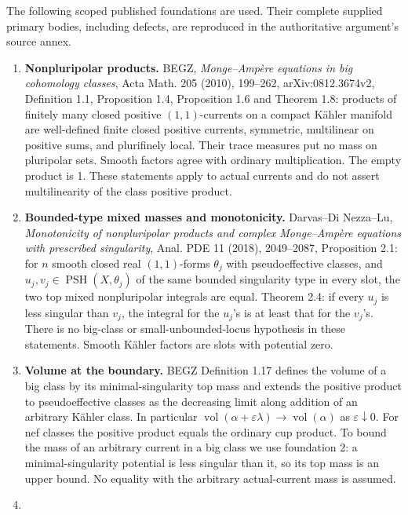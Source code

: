 \documentclass[
  11pt,
]{article}
\providecommand{\tightlist}{%
  \setlength{\itemsep}{0pt}\setlength{\parskip}{0pt}}
\begin{document}
The following scoped published foundations are used. Their complete
supplied primary bodies, including defects, are reproduced in the
authoritative argument's source annex.

\begin{enumerate}
\def\labelenumi{\arabic{enumi}.}
\tightlist
\item
  \textbf{Nonpluripolar products.} BEGZ, \emph{Monge--Ampère equations
  in big cohomology classes}, Acta Math. 205 (2010), 199--262,
  arXiv:0812.3674v2, Definition 1.1, Proposition 1.4, Proposition 1.6
  and Theorem 1.8: products of finitely many closed positive
  \((1,1)\)-currents on a compact Kähler manifold are well-defined
  finite closed positive currents, symmetric, multilinear on positive
  sums, and plurifinely local. Their trace measures put no mass on
  pluripolar sets. Smooth factors agree with ordinary multiplication.
  The empty product is 1. These statements apply to actual currents and
  do not assert multilinearity of the class positive product.
\item
  \textbf{Bounded-type mixed masses and monotonicity.} Darvas--Di
  Nezza--Lu, \emph{Monotonicity of nonpluripolar products and complex
  Monge--Ampère equations with prescribed singularity}, Anal. PDE 11
  (2018), 2049--2087, Proposition 2.1: for \(n\) smooth closed real
  \((1,1)\)-forms \(\theta_j\) with pseudoeffective classes, and
  \(u_j,v_j\in\operatorname{PSH}(X,\theta_j)\) of the same bounded
  singularity type in every slot, the two top mixed nonpluripolar
  integrals are equal. Theorem 2.4: if every \(u_j\) is less singular
  than \(v_j\), the integral for the \(u_j\)'s is at least that for the
  \(v_j\)'s. There is no big-class or small-unbounded-locus hypothesis
  in these statements. Smooth Kähler factors are slots with potential
  zero.
\item
  \textbf{Volume at the boundary.} BEGZ Definition 1.17 defines the
  volume of a big class by its minimal-singularity top mass and extends
  the positive product to pseudoeffective classes as the decreasing
  limit along addition of an arbitrary Kähler class. In particular
  \(\operatorname{vol}(\alpha+\varepsilon\lambda)\to\operatorname{vol}(\alpha)\)
  as \(\varepsilon\downarrow0\). For nef classes the positive product
  equals the ordinary cup product. To bound the mass of an arbitrary
  current in a big class we use foundation 2: a minimal-singularity
  potential is less singular than it, so its top mass is an upper bound.
  No equality with the arbitrary actual-current mass is assumed.
\item

\end{enumerate}
\end{document}
